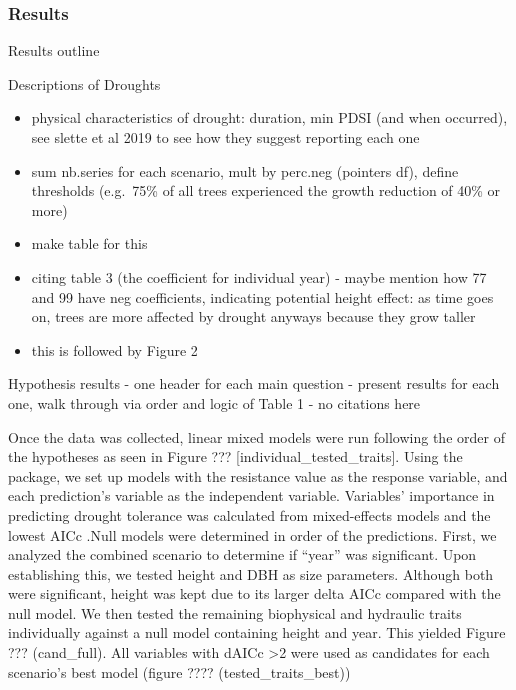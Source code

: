 \documentclass[]{article}
\providecommand{\tightlist}{%
  \setlength{\itemsep}{0pt}\setlength{\parskip}{0pt}}
\begin{document}
\subsubsection{Results}\label{results}

Results outline

Descriptions of Droughts

\begin{itemize}
\tightlist
\item
  physical characteristics of drought: duration, min PDSI (and when
  occurred), see slette et al 2019 to see how they suggest reporting
  each one
\item
  sum nb.series for each scenario, mult by perc.neg (pointers df),
  define thresholds (e.g.~75\% of all trees experienced the growth
  reduction of 40\% or more)
\item
  make table for this
\item
  citing table 3 (the coefficient for individual year) - maybe mention
  how 77 and 99 have neg coefficients, indicating potential height
  effect: as time goes on, trees are more affected by drought anyways
  because they grow taller
\item
  this is followed by Figure 2
\end{itemize}

Hypothesis results - one header for each main question - present results
for each one, walk through via order and logic of Table 1 - no citations
here

Once the data was collected, linear mixed models were run following the
order of the hypotheses as seen in Figure ???
{[}individual\_tested\_traits{]}. Using the \citep{R-pointRes} package,
we set up models with the resistance value as the response variable, and
each prediction's variable as the independent variable. Variables'
importance in predicting drought tolerance was calculated from
mixed-effects models and the lowest AICc
\citep[\citet{R-AICcmodavg}]{R-lme4}.Null models were determined in
order of the predictions. First, we analyzed the combined scenario to
determine if ``year'' was significant. Upon establishing this, we tested
height and DBH as size parameters. Although both were significant,
height was kept due to its larger delta AICc compared with the null
model. We then tested the remaining biophysical and hydraulic traits
individually against a null model containing height and year. This
yielded Figure ??? (cand\_full). All variables with dAICc
\textgreater{}2 were used as candidates for each scenario's best model
(figure ???? (tested\_traits\_best))
\end{document}
